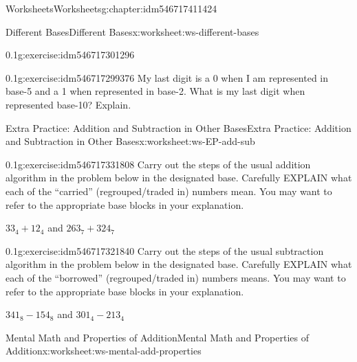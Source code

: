 \documentclass[twoside,11pt,]{book}
\begin{document}
\begin{chapterptx}{Worksheets}{}{Worksheets}{}{}{g:chapter:idm546717411424}
\begin{worksheet-section-numberless}{Different Bases}{}{Different Bases}{}{}{x:worksheet:ws-different-bases}
\begin{divisionexercise}{6}{}{0.1}{g:exercise:idm546717301296}
\end{divisionexercise}%
\begin{divisionexercise}{7}{}{0.1}{g:exercise:idm546717299376}%
My last digit is a 0 when I am represented in base-5 and a 1 when represented in base-2.  What is my last digit when represented base-10? Explain.%
\end{divisionexercise}%
\end{worksheet-section-numberless}
\restoregeometry
%
%
\typeout{************************************************}
\typeout{************************************************}
%
\begin{worksheet-section-numberless}{Extra Practice: Addition and Subtraction in Other Bases}{}{Extra Practice: Addition and Subtraction in Other Bases}{}{}{x:worksheet:ws-EP-add-sub}
\begin{divisionexercise}{1}{}{0.1}{g:exercise:idm546717331808}%
Carry out the steps of the usual addition algorithm in the problem below in the designated base.  Carefully EXPLAIN what each of the “carried” (regrouped\slash{}traded in) numbers mean.  You may want to refer to the appropriate base blocks in your explanation.%
\par
\(33_4+12_4\) and \(263_7+324_7\)%
\end{divisionexercise}%
\begin{divisionexercise}{2}{}{0.1}{g:exercise:idm546717321840}%
Carry out the steps of the usual subtraction algorithm in the problem below in the designated base.  Carefully EXPLAIN what each of the “borrowed” (regrouped\slash{}traded in) numbers means.  You may want to refer to the appropriate base blocks in your explanation.%
\par
\(341_8 - 154_8 \) and \(301_4 -213_4\)%
\end{divisionexercise}%
\end{worksheet-section-numberless}
\restoregeometry
%
%
\typeout{************************************************}
\typeout{************************************************}
%
\begin{worksheet-section-numberless}{Mental Math and Properties of Addition}{}{Mental Math and Properties of Addition}{}{}{x:worksheet:ws-mental-add-properties}
\begin{introduction}{}%

\end{introduction}
\end{worksheet-section-numberless}
\end{chapterptx}
\end{document}
